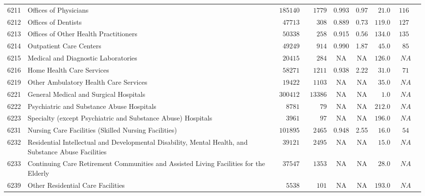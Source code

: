 \documentclass[9pt, oneside]{article}   	%
\begin{document}
\begin{longtable}{lp{3 in}ccccccc}
6211  & Offices of Physicians & $185140$ & $\phantom{00}1779$ & 0.993 &  0.97 & $\phantom{0}21.0$ & $116$ \\
6212  & Offices of Dentists & $\phantom{0}47713$ & $\phantom{000}308$ & 0.889 &  0.73 & $119.0$ & $127$ \\
6213  & Offices of Other Health Practitioners & $\phantom{0}50338$ & $\phantom{000}258$ & 0.915 &  0.56 & $134.0$ & $135$ \\
6214  & Outpatient Care Centers & $\phantom{0}49249$ & $\phantom{000}914$ & 0.990 &  1.87 & $\phantom{0}45.0$ & $\phantom{0}85$ \\
6215  & Medical and Diagnostic Laboratories & $\phantom{0}20415$ & $\phantom{000}284$ &    NA &    NA & $126.0$ & $\phantom{0}NA$ \\
6216  & Home Health Care Services & $\phantom{0}58271$ & $\phantom{00}1211$ & 0.938 &  2.22 & $\phantom{0}31.0$ & $\phantom{0}71$ \\
6219  & Other Ambulatory Health Care Services & $\phantom{0}19422$ & $\phantom{00}1103$ &    NA &    NA & $\phantom{0}35.0$ & $\phantom{0}NA$ \\

6221  & General Medical and Surgical Hospitals & $300412$ & $\phantom{0}13386$ &    NA &    NA & $\phantom{00}1.0$ & $\phantom{0}NA$ \\
6222  & Psychiatric and Substance Abuse Hospitals & $\phantom{00}8781$ & $\phantom{0000}79$ &    NA &    NA & $212.0$ & $\phantom{0}NA$ \\
6223  & Specialty (except Psychiatric and Substance Abuse) Hospitals & $\phantom{00}3961$ & $\phantom{0000}97$ &    NA &    NA & $196.0$ & $\phantom{0}NA$ \\

6231  & Nursing Care Facilities (Skilled Nursing Facilities) & $101895$ & $\phantom{00}2465$ & 0.948 &  2.55 & $\phantom{0}16.0$ & $\phantom{0}54$ \\
6232  & Residential Intellectual and Developmental Disability, Mental Health, and Substance Abuse Facilities & $\phantom{0}39121$ & $\phantom{00}2495$ &    NA &    NA & $\phantom{0}15.0$ & $\phantom{0}NA$ \\
6233  & Continuing Care Retirement Communities and Assisted Living Facilities for the Elderly & $\phantom{0}37547$ & $\phantom{00}1353$ &    NA &    NA & $\phantom{0}28.0$ & $\phantom{0}NA$ \\
6239  & Other Residential Care Facilities & $\phantom{00}5538$ & $\phantom{000}101$ &    NA &    NA & $193.0$ & $\phantom{0}NA$ \\


\end{longtable}
\end{document}
